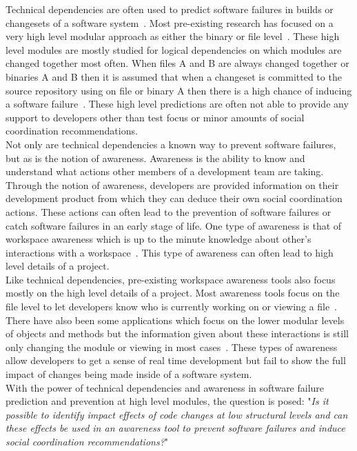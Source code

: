 \documentclass[conference]{IEEEtran}
\begin{document}
Technical dependencies are often used to predict software failures in builds or changesets of
a software system~\cite{Pinzger:2008:DNP, Zimmermann:2008:PDU}. Most pre-existing research
has focused on a very high level modular approach as either the binary or file level~\cite{Kim:2006:AIB}. 
These high level
modules are mostly studied for logical dependencies on which modules are changed together most
often. When files A and B are always changed together or binaries A and B then it is assumed that
when a changeset is committed to the source repository using on file or binary A then there is
a high chance of inducing a software failure~\cite{Beyer:2005:CSA}. These high level predictions are often not able to
provide any support to developers other than test focus or minor amounts of social
coordination recommendations.\\

Not only are technical dependencies a known way to prevent software failures, but as is the 
notion of awareness. Awareness is the ability to know and understand what actions
other members of a development team are taking. Through the notion of awareness, developers
are provided information on their development product from which they can deduce their
own social coordination actions. These actions can often lead to the prevention of software
failures or catch software failures in an early stage of life. One type of awareness is that of
workspace awareness which is up to the minute knowledge about other's interactions
with a workspace~\cite{Gutwin:1996:WAR, Gutwin:1996:USA}. This type of awareness can
often lead to high level details of a project.\\

Like technical dependencies, pre-existing workspace awareness tools also focus mostly on the high level
details of a project. Most awareness tools focus on the file level to let developers know who
is currently working on or viewing a file~\cite{Biehl:2007:FVD}. There have also been some applications which focus
on the lower modular levels of objects and methods but the information given about these
interactions is still only changing the module or viewing in most cases~\cite{Biehl:2007:FVD}.
These types of awareness
allow developers to get a sense of real time development but fail to show the full impact
of changes being made inside of a software system.\\

With the power of technical dependencies and awareness in software failure prediction and
prevention at high level modules, the question is posed:
"\textit{Is it possible to identify impact effects of code changes at low structural levels and can
these effects be used in an awareness tool to prevent software failures and induce social
coordination recommendations?}"\\
\end{document}
